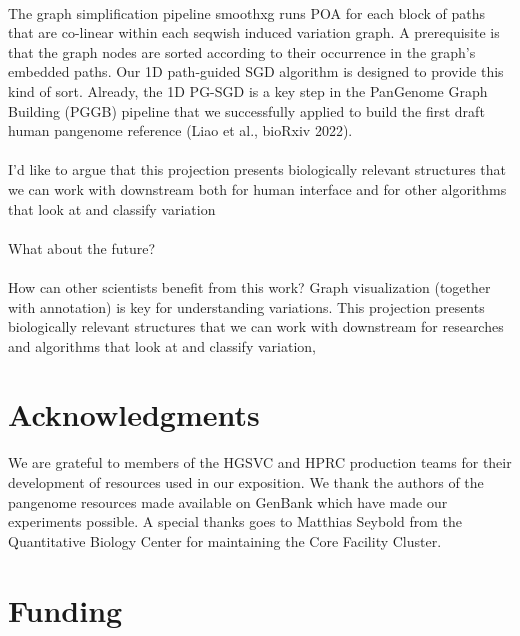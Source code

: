 \documentclass{bioinfo}
\theoremstyle{definition}
\begin{document}
\paragraph{}
The graph simplification pipeline smoothxg runs POA for each block of paths that are co-linear within each seqwish induced variation graph.
A prerequisite is that the graph nodes are sorted according to their occurrence in the graph's embedded paths.
Our 1D path-guided SGD algorithm is designed to provide this kind of sort.
Already, the 1D PG-SGD is a key step in the PanGenome Graph Building (PGGB) pipeline that we successfully applied to build the first draft human pangenome reference (Liao et al., bioRxiv 2022).
\paragraph{}
I'd like to argue that this projection presents biologically relevant structures that we can work with downstream
both for human interface
and for other algorithms that look at and classify variation
\paragraph{}
What about the future?
\paragraph{}
How can other scientists benefit from this work?
Graph visualization (together with annotation) is key for understanding variations.
This projection presents biologically relevant structures that we can work with downstream for researches and algorithms that look at and classify variation,

\section*{Acknowledgments}

We are grateful to members of the HGSVC and HPRC production teams for their development of resources used in our exposition.
We thank the authors of the pangenome resources made available on GenBank which have made our experiments possible. A special thanks goes to Matthias Seybold from the Quantitative Biology Center for maintaining the Core Facility Cluster.

\section*{Funding}
\end{document}
